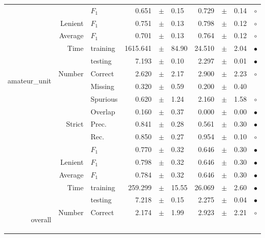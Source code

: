 \begin{longtable}{|r|r|l||rcl|rcl|c|}
\cline{3-10}
  &  &  $F_1$  & 0.651 &  $\pm$  & 0.15 & 0.729 &  $\pm$  & 0.14 &  $\circ$\\
\cline{2-10}
  & Lenient &  $F_1$  & 0.751 &  $\pm$  & 0.13 & 0.798 &  $\pm$  & 0.12 &  $\circ$\\
\cline{2-10}
  & Average &  $F_1$  & 0.701 &  $\pm$  & 0.13 & 0.764 &  $\pm$  & 0.12 &  $\circ$\\
\cline{2-10}
  & \multirow{2}{*}{Time} &  training  & 1615.641 &  $\pm$  & 84.90 & 24.510 &  $\pm$  & 2.04 &  $\bullet$\\
\cline{3-10}
  &  &  testing  & 7.193 &  $\pm$  & 0.10 & 2.297 &  $\pm$  & 0.01 &  $\bullet$\\
\hline
\hline
\multirow{11}{*}{\begin{sideways}amateur\_unit\end{sideways} } & \multirow{4}{*}{Number} &  Correct  & 2.620 &  $\pm$  & 2.17 & 2.900 &  $\pm$  & 2.23 &  $\circ$\\
\cline{3-10}
  &  &  Missing  & 0.320 &  $\pm$  & 0.59 & 0.200 &  $\pm$  & 0.40 &   \\
\cline{3-10}
  &  &  Spurious  & 0.620 &  $\pm$  & 1.24 & 2.160 &  $\pm$  & 1.58 &  $\circ$\\
\cline{3-10}
  &  &  Overlap  & 0.160 &  $\pm$  & 0.37 & 0.000 &  $\pm$  & 0.00 &  $\bullet$\\
\cline{2-10}
  & \multirow{3}{*}{Strict} &  Prec.  & 0.841 &  $\pm$  & 0.28 & 0.561 &  $\pm$  & 0.30 &  $\bullet$\\
\cline{3-10}
  &  &  Rec.  & 0.850 &  $\pm$  & 0.27 & 0.954 &  $\pm$  & 0.10 &  $\circ$\\
\cline{3-10}
  &  &  $F_1$  & 0.770 &  $\pm$  & 0.32 & 0.646 &  $\pm$  & 0.30 &  $\bullet$\\
\cline{2-10}
  & Lenient &  $F_1$  & 0.798 &  $\pm$  & 0.32 & 0.646 &  $\pm$  & 0.30 &  $\bullet$\\
\cline{2-10}
  & Average &  $F_1$  & 0.784 &  $\pm$  & 0.32 & 0.646 &  $\pm$  & 0.30 &  $\bullet$\\
\cline{2-10}
  & \multirow{2}{*}{Time} &  training  & 259.299 &  $\pm$  & 15.55 & 26.069 &  $\pm$  & 2.60 &  $\bullet$\\
\cline{3-10}
  &  &  testing  & 7.218 &  $\pm$  & 0.15 & 2.275 &  $\pm$  & 0.04 &  $\bullet$\\
\hline
\hline
\multirow{11}{*}{\begin{sideways}overall\end{sideways} } & \multirow{4}{*}{Number} &  Correct  & 2.174 &  $\pm$  & 1.99 & 2.923 &  $\pm$  & 2.21 &  $\circ$\\

\end{longtable}
